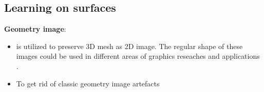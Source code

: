 \subsection*{Learning on surfaces}
\textbf{Geometry image}: 
\begin{itemize}
\item is utilized to preserve 3D mesh as 2D image. The regular shape of these images could be used in different areas of graphics reseaches and applications \cite{gu2002geometry}.
\item To get rid of classic geometry image artefacts \cite{Spherical_Parametrization, sinha2016deep}
\end{itemize}   

